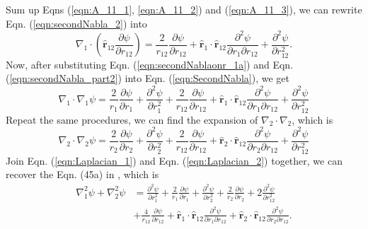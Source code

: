 Sum up Eqns (\ref{eqn:A_11_1}, \ref{eqn:A_11_2}) and (\ref{eqn:A_11_3}), we can rewrite Eqn. (\ref{eqn:secondNabla_2}) into
\begin{equation}
    \nabla_1\cdot\left(\hat{\textbf{r}}_{12}\frac{\partial\psi}{\partial r_{12}}\right)=\frac{2}{r_{12}}\frac{\partial\psi}{\partial r_{12}}+\hat{\textbf{r}}_1\cdot\hat{\textbf{r}}_{12}\frac{\partial^2\psi}{\partial r_1\partial r_{12}}+\frac{\partial^2\psi}{\partial r^2_{12}}.
    \label{eqn:secondNabla_part2}
\end{equation}
Now, after substituting Eqn. (\ref{eqn:secondNablaonr_1a}) and Eqn. (\ref{eqn:secondNabla_part2}) into Eqn. (\ref{eqn:SecondNabla}), we get
\begin{equation}
    \nabla_1\cdot\nabla_1\psi=\frac{2}{r_1}\frac{\partial\psi}{\partial r_1}+\frac{\partial^2\psi}{\partial r_1^2}+\frac{2}{r_{12}}\frac{\partial\psi}{\partial r_{12}}+\hat{\textbf{r}}_1\cdot\hat{\textbf{r}}_{12}\frac{\partial^2\psi}{\partial r_1\partial r_{12}}+\frac{\partial^2\psi}{\partial r^2_{12}}
    \label{eqn:Laplacian_1}
\end{equation}
Repeat the same procedures, we can find the expansion of $\nabla_2\cdot\nabla_2$, which is
\begin{equation}
    \nabla_2\cdot\nabla_2\psi=\frac{2}{r_2}\frac{\partial\psi}{\partial r_2}+\frac{\partial^2\psi}{\partial r_2^2}+\frac{2}{r_{12}}\frac{\partial\psi}{\partial r_{12}}+\hat{\textbf{r}}_2\cdot\hat{\textbf{r}}_{12}\frac{\partial^2\psi}{\partial r_2\partial r_{12}}+\frac{\partial^2\psi}{\partial r^2_{12}}
    \label{eqn:Laplacian_2}
\end{equation}
Join Eqn. (\ref{eqn:Laplacian_1}) and Eqn. (\ref{eqn:Laplacian_2}) together, we can recover the Eqn. (45a) in \cite{HYLLERAAS19641}, which is
\begin{equation}
    \begin{split}
        \nabla_1^2\psi+\nabla_2^2\psi&=\frac{\partial^2\psi}{\partial r_1^2}+\frac{2}{r_1}\frac{\partial\psi}{\partial r_1}+\frac{\partial^2\psi}{\partial r_2^2}+\frac{2}{r_2}\frac{\partial\psi}{\partial r_2}+2\frac{\partial^2\psi}{\partial r_{12}^2} \\
        &+\frac{4}{r_{12}}\frac{\partial\psi}{\partial r_{12}}+\hat{\textbf{r}}_1\cdot\hat{\textbf{r}}_{12}\frac{\partial^2\psi}{\partial r_1\partial r_{12}}+\hat{\textbf{r}}_2\cdot\hat{\textbf{r}}_{12}\frac{\partial^2\psi}{\partial r_2\partial r_{12}}.
    \end{split}
\end{equation}

